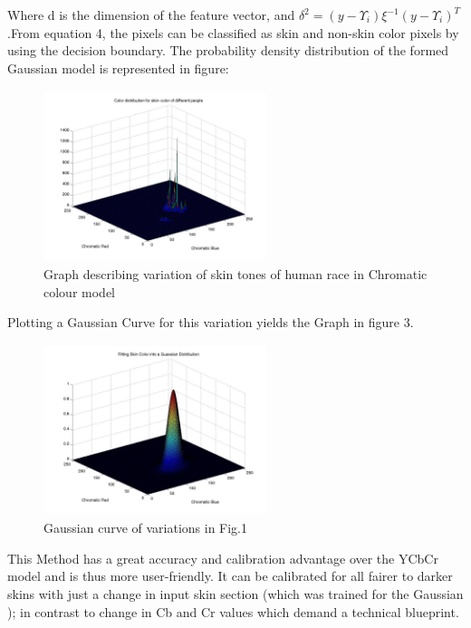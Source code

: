 \documentclass[conference]{IEEEtran}
\begin{document}
Where d is the dimension of the feature vector, and \linebreak
$\delta^2 =(y - \Upsilon_i)\xi^{-1}(y - \Upsilon_i)^T $ .From equation 4, the pixels can be classified as skin and non-skin color pixels by using the decision boundary. The probability density distribution of the formed Gaussian model is represented in figure:
\begin{figure}[h!]
	\centering
	\includegraphics[width = 6.5cm, height = 5cm]{skincolor}
	\caption{ Graph describing variation of skin tones of human race in Chromatic colour model}
\end{figure}
Plotting a Gaussian Curve for this variation yields the Graph in figure 3.
\begin{figure}[h!]
	\centering
	\includegraphics[width = 6.5cm, height = 5cm]{gaussian}
	\caption{Gaussian curve of variations in Fig.1}
\end{figure}

This Method has a great accuracy and calibration advantage over the YCbCr model and is thus more user-friendly. It can be calibrated for all fairer to darker skins with just a change in input skin section (which was trained for the Gaussian ); in contrast to change in Cb and Cr values which demand a technical blueprint.
\end{document}
